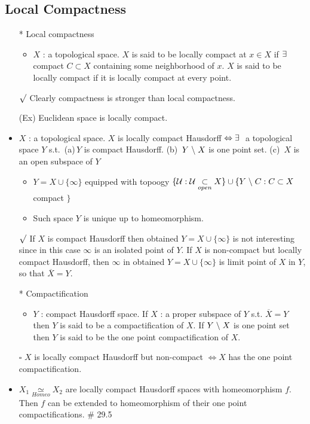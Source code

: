 \documentclass[12pt]{article}
\newcommand{\sq}{$\square$}
\newcommand{\rmk}{$\surd$}
\newcommand{\spone}{\hspace{0.1cm}}
\newcommand{\U}{\mathcal{U}}
\newcommand{\open}{\underset{open}{\subset}}
\newcommand{\cl}{\overline}
\newcommand{\diff}{\spone\backslash\spone}
\newcommand{\exist}{\exists\spone}
\newcommand{\homeo}{\underset{Homeo}{\simeq}}
\begin{document}
\subsection{Local Compactness}
\smallskip
\begin{itemize}
	\item[*]Local compactness
	\begin{itemize}
		\item $X$ : a topological space. $X$ is said to be locally compact at $x\in X$ if $\exist$ compact $ C\subset X$ containing some neighborhood of $x$. \; $X$ is said to be locally compact if it is locally compact at every point.
	\end{itemize}
	\item[\rmk] Clearly compactness is stronger than local compactness.
	\item[(Ex)] Euclidean space is locally compact.  
	\item $X$ : a topological space. $X$ is locally compact Hausdorff $\Leftrightarrow \exist$ a topological space $Y$ s.t. \,(a)\,$Y$ is compact Hausdorff. (b)\, $Y\diff X$ is one point set. (c)\, $X$ is an open subspace of $Y$
	\begin{itemize}
		\item $Y=X\cup \{\infty\}$ equipped with topoogy $\{\U : \U\open X\}\cup\{Y\diff C : C\subset X$ compact $\}$
		\item Such space $Y$ is unique up to homeomorphism.
	\end{itemize}
	\item[\rmk] If $X$ is compact Hausdorff then obtained $Y=X\cup\{\infty\}$ is not interesting since in this case $\infty$ is an isolated point of $Y$. If $X$ is non-compact but locally compact Hausdorff, then $\infty$ in obtained $Y=X\cup\{\infty\}$ is limit point of $X$ in $Y$, so that $\cl{X}=Y$.
	\item[*]Compactification
	\begin{itemize}
		\item $Y$ : compact Hausdorff space. If $X$ : a proper subspace of $Y$ s.t. $\cl{X}=Y$ then $Y$ is said to be a compactification of $X$. If $Y\diff X$ is one point set then $Y$ is said to be the one point compactification of $X$.
	\end{itemize}
	\item[\sq] $X$ is locally compact Hausdorff but non-compact $\Leftrightarrow X$ has the one point compactification.
	\item $X_1\homeo X_2$ are locally compact Hausdorff spaces with homeomorphism $f$. Then $f$ can be extended to homeomorphism of their one point compactifications. \quad \# 29.5 

\end{itemize}
\end{document}
